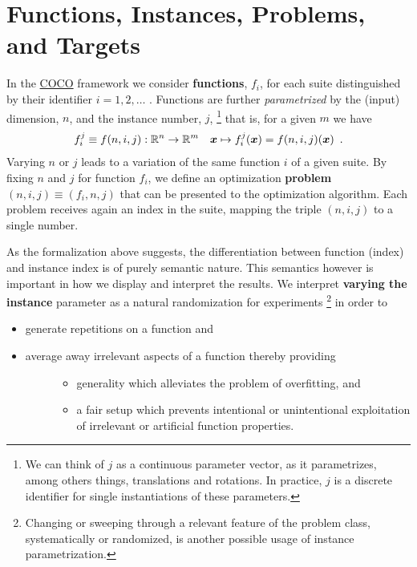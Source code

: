 \documentclass[letterpaper,12pt,english]{article}
\newcommand{\R}{\ensuremath{\mathbb{R}}}
\newcommand{\ve}[1]{{\boldsymbol{#1}}}
\newcommand{\x}{\ensuremath{\ve{x}}}
\newcommand{\finstance}{\ensuremath{f^j}}
\begin{document}
\section{Functions, Instances, Problems, and Targets}
\label{index:functions-instances-problems-and-targets}
In the \href{https://github.com/numbbo/coco}{COCO} framework we consider \textbf{functions}, \(f_i\), for each suite
distinguished by their identifier \(i=1,2,\dots\) .
Functions are further
\emph{parametrized} by the (input) dimension, \(n\), and the instance number, \(j\), \footnote[6]{
We can think of \(j\) as a continuous parameter vector, as it
parametrizes, among others things, translations and rotations. In practice,
\(j\) is a discrete identifier for single instantiations of these parameters.
}
that is, for a given \(m\) we have
\begin{gather}
\begin{split}\finstance_i \equiv f(n, i, j):\R^n \to \mathbb{R}^m \quad
\x \mapsto \finstance_i (\x) = f(n, i, j)(\x)\enspace.\end{split}\notag
\end{gather}
Varying \(n\) or \(j\) leads to a variation of the same function
\(i\) of a given suite.
By fixing \(n\) and \(j\) for function \(f_i\), we define an optimization \textbf{problem}
\((n, i, j)\equiv(f_i, n, j)\) that can be presented to the optimization algorithm. Each problem receives again
an index in the suite, mapping the triple \((n, i, j)\) to a single
number.

As the formalization above suggests, the differentiation between function (index)
and instance index is of purely semantic nature.
This semantics however is important in how we display and
interpret the results. We interpret \textbf{varying the instance} parameter as
a natural randomization for experiments \footnote[7]{
Changing or sweeping through a relevant feature of the problem class,
systematically or randomized, is another possible usage of instance
parametrization.
} in order to
\begin{itemize}
\item {} 
generate repetitions on a function and

\item {} \begin{description}
\item[{average away irrelevant aspects of a function thereby providing}] \leavevmode\begin{itemize}
\item {} 
generality which alleviates the problem of overfitting, and

\item {} 
a fair setup which prevents intentional or unintentional exploitation of
irrelevant or artificial function properties.

\end{itemize}

\end{description}

\end{itemize}
\end{document}
